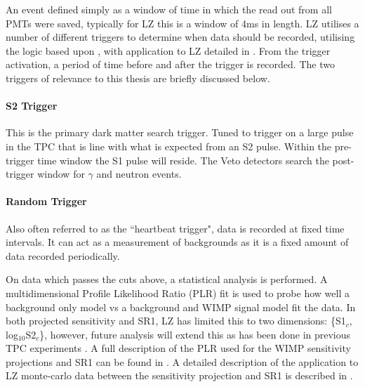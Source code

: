 \par
An event defined simply as a window of time in which the read out from all PMTs were saved, typically for LZ this is a window of 4ms in length.
LZ utilises a number of different triggers to determine when data should be recorded, utilising the logic based upon \cite{lux_trigger_logic_ref}, with application to LZ detailed in \cite{nicolasangelides_thesis_ref}.
From the trigger activation, a period of time before and after the trigger is recorded.
The two triggers of relevance to this thesis are briefly discussed below.

\paragraph{S2 Trigger}
\par
This is the primary dark matter search trigger.
Tuned to trigger on a large pulse in the TPC that is line with what is expected from an S2 pulse.
Within the pre-trigger time window the S1 pulse will reside.
The Veto detectors search the post-trigger window for $\gamma$ and neutron events.

\paragraph{Random Trigger}
Also often referred to as the ``heartbeat trigger", data is recorded at fixed time intervals.
It can act as a measurement of backgrounds as it is a fixed amount of data recorded periodically.

\par
On data which passes the cuts above, a statistical analysis is performed.
A multidimensional Profile Likelihood Ratio (PLR) fit is used to probe how well a background only model vs a background and WIMP signal model fit the data.
In both projected sensitivity and SR1, LZ has limited this to two dimensions: \{S1$_c$, log$_{10}$S2$_c$\}, however, future analysis will extend this as has been done in previous TPC experiments \cite{LUX_RUN1_EFT_2021,LUX_RUN4_EFT_2021,shaunalsum_thesis_ref}.
A full description of the PLR used for the WIMP sensitivity projections and SR1 can be found in \cite{LZ_Ibles_LZStats_Thesis_ref}. 
A detailed description of the application to LZ monte-carlo data between the sensitivity projection and SR1 is described in \cite{jonathannikoleyczik_thesis_ref}.

